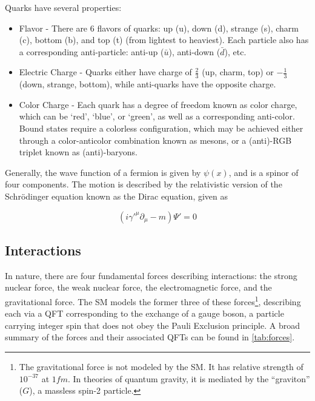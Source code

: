         Quarks have several properties:
        \begin{itemize}
            \item Flavor - There are 6 flavors of quarks: up (u), down (d), strange (s), charm (c), bottom (b), and top (t) (from lightest to heaviest). Each particle also has a corresponding anti-particle: anti-up ($\bar{u}$), anti-down ($\bar{d}$), etc.
            \item Electric Charge - Quarks either have charge of $\frac{2}{3}$ (up, charm, top) or $-\frac{1}{3}$ (down, strange, bottom), while anti-quarks have the opposite charge. 
            \item Color Charge - Each quark has a degree of freedom known as color charge, which can be `red', `blue', or `green', as well as a corresponding anti-color. Bound states require a colorless configuration, which may be achieved either through a color-anticolor combination known as mesons, or a (anti)-RGB triplet known as (anti)-baryons.
        \end{itemize}


        Generally, the wave function of a fermion is given by $\psi(x)$, and is a spinor of four components. The motion is described by the relativistic version of the Schr{\"o}dinger equation known as the Dirac equation, given as

        \begin{equation} \label{eqn:dirac}
            (i\gamma'^{\mu}\partial_{\mu}-m)\Psi' = 0
        \end{equation}

        \subsection{Interactions}

        In nature, there are four fundamental forces describing interactions: the strong nuclear force, the weak nuclear force, the electromagnetic force, and the gravitational force. The \gls{SM} models the former three of these forces\footnote{The gravitational force is not modeled by the \gls{SM}. It has relative strength of $10^{-37}$ at $\unit{1}{fm}$. In theories of quantum gravity, it is mediated by the ``graviton'' ($G$), a massless spin-2 particle.}, describing each via a \gls{QFT} corresponding to the exchange of a gauge boson, a particle carrying integer spin that does not obey the Pauli Exclusion principle. A broad summary of the forces and their associated \glspl{QFT} can be found in \ref{tab:forces}.

